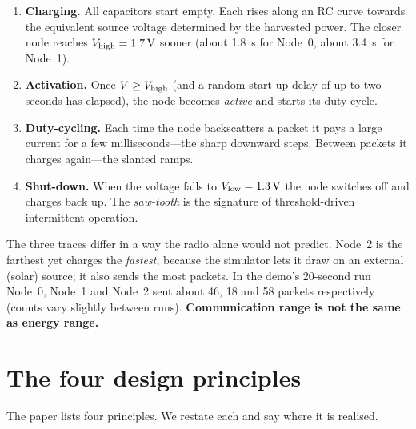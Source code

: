 \begin{enumerate}
 \item \textbf{Charging.} All capacitors start empty. Each rises along an RC
   curve towards the equivalent source voltage determined by the harvested
   power. The closer node reaches $V_{\mathrm{high}}=\SI{1.7}{V}$ sooner (about
   \SI{1.8}{s} for Node~0, about \SI{3.4}{s} for Node~1).
 \item \textbf{Activation.} Once $V\ge V_{\mathrm{high}}$ (and a random start-up delay of
   up to two seconds has elapsed), the node becomes \emph{active} and starts its
   duty cycle.
 \item \textbf{Duty-cycling.} Each time the node backscatters a packet it pays a
   large current for a few milliseconds---the sharp downward steps. Between
   packets it charges again---the slanted ramps.
 \item \textbf{Shut-down.} When the voltage falls to $V_{\mathrm{low}}=\SI{1.3}{V}$ the node
   switches off and charges back up. The \emph{saw-tooth} is the signature of
   threshold-driven intermittent operation.
\end{enumerate}
The three traces differ in a way the radio alone would not predict. Node~2 is the farthest yet charges the \emph{fastest}, because the simulator
lets it draw on an external (solar) source; it also sends the most packets.
In the demo's 20-second run Node~0, Node~1 and Node~2 sent about 46, 18 and 58
packets respectively (counts vary slightly between runs). \textbf{Communication range is not the same as energy range.}

\section{The four design principles}
\label{sec:principles}

The paper lists four principles. We restate each and say where it is
realised.

